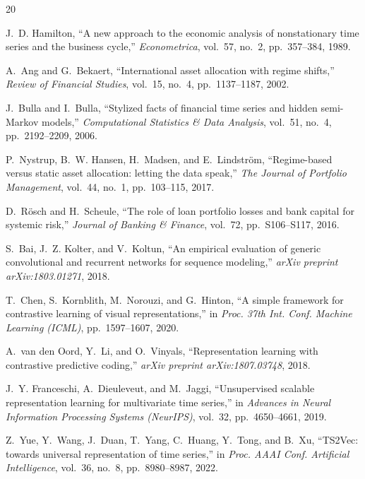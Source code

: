 \begin{thebibliography}{20}

J.~D. Hamilton, ``A new approach to the economic analysis of nonstationary time series and the business cycle,'' \textit{Econometrica}, vol.~57, no.~2, pp.~357--384, 1989.

A.~Ang and G.~Bekaert, ``International asset allocation with regime shifts,'' \textit{Review of Financial Studies}, vol.~15, no.~4, pp.~1137--1187, 2002.

J.~Bulla and I.~Bulla, ``Stylized facts of financial time series and hidden semi-Markov models,'' \textit{Computational Statistics \& Data Analysis}, vol.~51, no.~4, pp.~2192--2209, 2006.

P.~Nystrup, B.~W. Hansen, H.~Madsen, and E.~Lindstr\"{o}m, ``Regime-based versus static asset allocation: letting the data speak,'' \textit{The Journal of Portfolio Management}, vol.~44, no.~1, pp.~103--115, 2017.

D.~R\"{o}sch and H.~Scheule, ``The role of loan portfolio losses and bank capital for systemic risk,'' \textit{Journal of Banking \& Finance}, vol.~72, pp.~S106--S117, 2016.

S.~Bai, J.~Z. Kolter, and V.~Koltun, ``An empirical evaluation of generic convolutional and recurrent networks for sequence modeling,'' \textit{arXiv preprint arXiv:1803.01271}, 2018.

T.~Chen, S.~Kornblith, M.~Norouzi, and G.~Hinton, ``A simple framework for contrastive learning of visual representations,'' in \textit{Proc. 37th Int. Conf. Machine Learning (ICML)}, pp.~1597--1607, 2020.

A.~van den Oord, Y.~Li, and O.~Vinyals, ``Representation learning with contrastive predictive coding,'' \textit{arXiv preprint arXiv:1807.03748}, 2018.

J.~Y. Franceschi, A.~Dieuleveut, and M.~Jaggi, ``Unsupervised scalable representation learning for multivariate time series,'' in \textit{Advances in Neural Information Processing Systems (NeurIPS)}, vol.~32, pp.~4650--4661, 2019.

Z.~Yue, Y.~Wang, J.~Duan, T.~Yang, C.~Huang, Y.~Tong, and B.~Xu, ``TS2Vec: towards universal representation of time series,'' in \textit{Proc. AAAI Conf. Artificial Intelligence}, vol.~36, no.~8, pp.~8980--8987, 2022.


\end{thebibliography}
